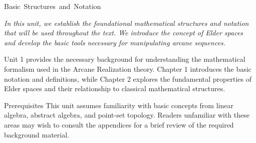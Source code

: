 
\unit{Basic Structures and Notation}

\begin{center}
\textit{In this unit, we establish the foundational mathematical structures and notation that will be used throughout the text. We introduce the concept of Elder spaces and develop the basic tools necessary for manipulating arcane sequences.}
\end{center}

\vspace{1cm}

\begin{chaptersummary}
Unit 1 provides the necessary background for understanding the mathematical formalism used in the Arcane Realization theory. Chapter 1 introduces the basic notation and definitions, while Chapter 2 explores the fundamental properties of Elder spaces and their relationship to classical mathematical structures.
\end{chaptersummary}

\vspace{1cm}

\begin{advancedtopic}{Prerequisites}
This unit assumes familiarity with basic concepts from linear algebra, abstract algebra, and point-set topology. Readers unfamiliar with these areas may wish to consult the appendices for a brief review of the required background material.
\end{advancedtopic}
